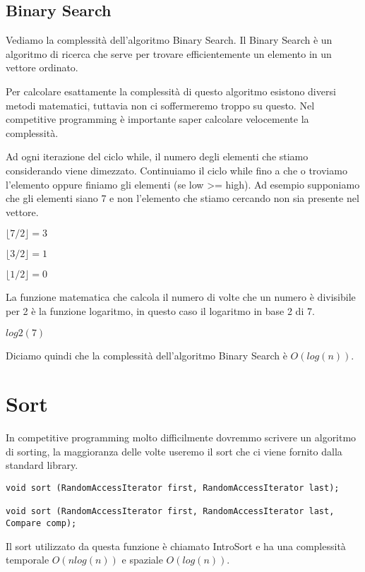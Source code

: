 \documentclass{article}
\newcommand{\floor}[1]{\lfloor #1 \rfloor}
\begin{document}
\subsection{Binary Search}

Vediamo la complessità dell'algoritmo Binary Search. Il Binary Search è un algoritmo di ricerca che serve per trovare efficientemente un elemento in un vettore ordinato.



Per calcolare esattamente la complessità di questo algoritmo esistono diversi metodi matematici, tuttavia non ci soffermeremo troppo su questo. Nel competitive programming è importante saper calcolare velocemente la complessità.


Ad ogni iterazione del ciclo while, il numero degli elementi che stiamo considerando viene dimezzato. 
Continuiamo il ciclo while fino a che o troviamo l'elemento oppure finiamo gli elementi (se low >= high).
Ad esempio supponiamo che gli elementi siano 7 e non l'elemento che stiamo cercando non sia presente nel vettore.

$ \floor{7/2} = 3 $

$ \floor{3/2} = 1 $

$ \floor{1/2} = 0 $

La funzione matematica che calcola il numero di volte che un numero è divisibile per 2 è la funzione logaritmo, in questo caso il logaritmo in base 2 di 7.

$ log2(7) $

Diciamo quindi che la complessità dell'algoritmo Binary Search è $O(log(n))$.

\section{Sort}

In competitive programming molto difficilmente dovremmo scrivere un algoritmo di sorting, la maggioranza delle volte useremo il sort che ci viene fornito dalla standard library.

\begin{lstlisting}
void sort (RandomAccessIterator first, RandomAccessIterator last);

void sort (RandomAccessIterator first, RandomAccessIterator last, Compare comp);
\end{lstlisting}

Il sort utilizzato da questa funzione è chiamato IntroSort e ha una complessità temporale $O(nlog(n))$ e spaziale $O(log(n))$.
\end{document}
